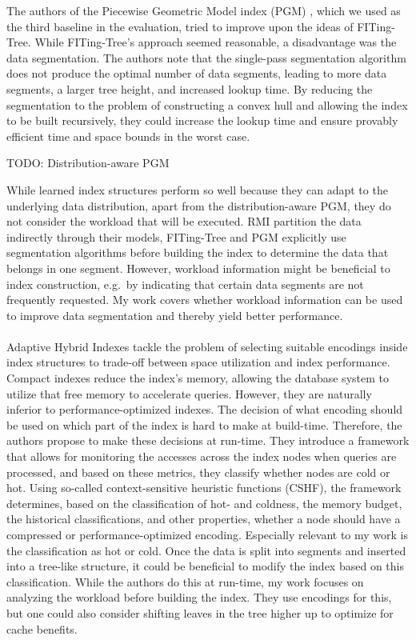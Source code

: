 The authors of the Piecewise Geometric Model index (PGM) \cite{Ferragina:2020pgm}, which we used as the third baseline in the evaluation, tried to improve upon the ideas of FITing-Tree. While FITing-Tree's approach seemed reasonable, a disadvantage was the data segmentation. The authors note that the single-pass segmentation algorithm does not produce the optimal number of data segments, leading to more data segments, a larger tree height, and increased lookup time. By reducing the segmentation to the problem of constructing a convex hull and allowing the index to be built recursively, they could increase the lookup time and ensure provably efficient time and space bounds in the worst case.

TODO: Distribution-aware PGM

While learned index structures perform so well because they can adapt to the underlying data distribution, apart from the distribution-aware PGM, they do not consider the workload that will be executed. RMI partition the data indirectly through their models, FITing-Tree and PGM explicitly use segmentation algorithms before building the index to determine the data that belongs in one segment. However, workload information might be beneficial to index construction, e.g.~by indicating that certain data segments are not frequently requested. My work covers whether workload information can be used to improve data segmentation and thereby yield better performance.

\paragraph{}
Adaptive Hybrid Indexes \cite{Anneser2022} tackle the problem of selecting suitable encodings inside index structures to trade-off between space utilization and index performance. Compact indexes reduce the index's memory, allowing the database system to utilize that free memory to accelerate queries. However, they are naturally inferior to performance-optimized indexes. The decision of what encoding should be used on which part of the index is hard to make at build-time. Therefore, the authors propose to make these decisions at run-time. They introduce a framework that allows for monitoring the accesses across the index nodes when queries are processed, and based on these metrics, they classify whether nodes are cold or hot. Using so-called context-sensitive heuristic functions (CSHF), the framework determines, based on the classification of hot- and coldness, the memory budget, the historical classifications, and other properties, whether a node should have a compressed or performance-optimized encoding. Especially relevant to my work is the classification as hot or cold. Once the data is split into segments and inserted into a tree-like structure, it could be beneficial to modify the index based on this classification. While the authors do this at run-time, my work focuses on analyzing the workload before building the index. They use encodings for this, but one could also consider shifting leaves in the tree higher up to optimize for cache benefits.

